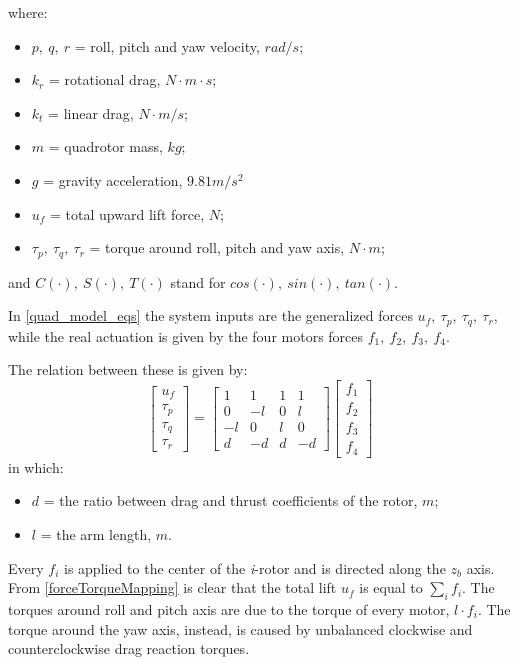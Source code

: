 \documentclass[11pt,a4paper]{scrartcl}
\begin{document}
where:
\begin{itemize}
	\item $ p, \ q, \ r $ = roll, pitch and yaw velocity, $ rad/s $;
	\item $ k_r $ = rotational drag, $ N \cdot m \cdot s  $;
	\item $ k_t $ = linear drag, $ N \cdot m/s  $;
	\item $ m $ = quadrotor mass, $ kg $;
	\item $ g $ = gravity acceleration, $ 9.81 m/s^2 $
	\item $ u_f $ = total upward lift force, $ N $;
	\item $ \tau_p, \ \tau_q, \ \tau_r $ = torque around roll, pitch and yaw axis, $ N\cdot m $;
\end{itemize}
and $ C(\cdot), \ S(\cdot), \ T(\cdot) $ stand for $ cos(\cdot), \ sin(\cdot), \ tan(\cdot) $.

In \eqref{quad_model_eqs} the system inputs are the generalized forces $ u_f, \ \tau_p, \ \tau_q, \ \tau_r $, while the real actuation is given by the four motors forces $ f_1, \ f_2, \ f_3, \ f_4 $.

The relation between these is given by:
\begin{equation}
	\begin{bmatrix}
	u_f \\ \tau_p \\ \tau_q \\ \tau_r
	\end{bmatrix} = 
	\begin{bmatrix}
	 1 & 1 & 1 & 1 \\
	 0 & -l & 0 & l \\
	 -l & 0 & l & 0 \\
	 d & -d & d & -d
	\end{bmatrix}
	\begin{bmatrix}
	f_1 \\ f_2 \\ f_3 \\ f_4
	\end{bmatrix}
	\label{forceTorqueMapping}
\end{equation}
in which:
\begin{itemize}
	\item $ d $ = the ratio between drag and thrust coefficients of the rotor, $ m $;
	\item $ l $ = the arm length, $ m $.
\end{itemize}

Every $ f_i $ is applied to the center of the \emph{i}-rotor and is directed along the $ z_b $ axis. From \eqref{forceTorqueMapping} is clear that the total lift $ u_f $ is equal to $ \sum_i f_i $. The torques around roll and pitch axis are due to the torque of every motor, $ l\cdot f_i $. The torque around the yaw axis, instead, is caused by unbalanced clockwise and counterclockwise drag reaction torques. 
\end{document}
